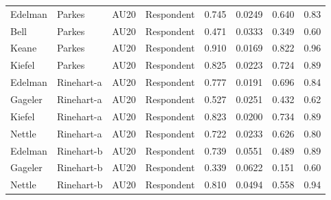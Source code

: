 \documentclass{monashthesis}
\begin{document}
\begin{center}
\begin{longtable}{llllllll}
Edelman & Parkes & AU20 & Respondent & 0.745 & 0.0249 & 0.640 & 0.83 \\
Bell & Parkes & AU20 & Respondent & 0.471 & 0.0333 & 0.349 & 0.60 \\
Keane & Parkes & AU20 & Respondent & 0.910 & 0.0169 & 0.822 & 0.96 \\
Kiefel & Parkes & AU20 & Respondent & 0.825 & 0.0223 & 0.724 & 0.89 \\
Edelman & Rinehart-a & AU20 & Respondent & 0.777 & 0.0191 & 0.696 & 0.84 \\
Gageler & Rinehart-a & AU20 & Respondent & 0.527 & 0.0251 & 0.432 & 0.62 \\
Kiefel & Rinehart-a & AU20 & Respondent & 0.823 & 0.0200 & 0.734 & 0.89 \\
Nettle & Rinehart-a & AU20 & Respondent & 0.722 & 0.0233 & 0.626 & 0.80 \\
Edelman & Rinehart-b & AU20 & Respondent & 0.739 & 0.0551 & 0.489 & 0.89 \\
Gageler & Rinehart-b & AU20 & Respondent & 0.339 & 0.0622 & 0.151 & 0.60 \\
Nettle & Rinehart-b & AU20 & Respondent & 0.810 & 0.0494 & 0.558 & 0.94 \\
\end{longtable}
\end{center}

\printbibliography[heading=bibintoc]
\end{document}
